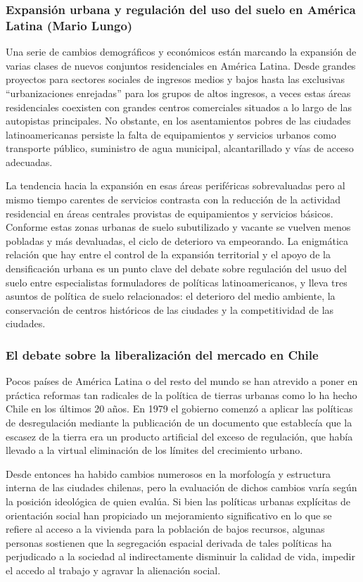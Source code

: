 \subsubsection*{Expansión urbana y regulación del uso del suelo en América Latina (Mario Lungo)}
Una serie de cambios demográficos y económicos están marcando la expansión de varias clases de
nuevos conjuntos residenciales en América Latina. Desde grandes proyectos para sectores sociales de
ingresos medios y bajos hasta las exclusivas ``urbanizaciones enrejadas'' para los grupos de altos
ingresos, a veces estas áreas residenciales coexisten con grandes centros comerciales situados a lo
largo de las autopistas principales. No obstante, en los asentamientos pobres de las ciudades
latinoamericanas persiste la falta de equipamientos y servicios urbanos como transporte público,
suministro de agua municipal, alcantarillado y vías de acceso adecuadas.

La tendencia hacia la expansión en esas áreas periféricas sobrevaluadas pero al mismo tiempo
carentes de servicios contrasta con la reducción de la actividad residencial en áreas centrales
provistas de equipamientos y servicios básicos. Conforme estas zonas urbanas de suelo subutilizado y
vacante se vuelven menos pobladas y más devaluadas, el ciclo de deterioro va empeorando. La
enigmática relación que hay entre el control de la expansión territorial y el apoyo de la
densificación urbana es un punto clave del debate sobre regulación del usuo del suelo entre
especialistas formuladores de políticas latinoamericanos, y lleva tres asuntos de política de suelo
relacionados: el deterioro del medio ambiente, la conservación de centros históricos de las ciudades
y la competitividad de las ciudades.

\subsubsection*{El debate sobre la liberalización del mercado en Chile}

Pocos países de América Latina o del resto del mundo se han atrevido a poner en práctica reformas
tan radicales de la política de tierras urbanas como lo ha hecho Chile en los últimos 20 años. En
1979 el gobierno comenzó a aplicar las políticas de desregulación mediante la publicación de un
documento que establecía que la escasez de la tierra era un producto artificial del exceso de
regulación, que había llevado a la virtual eliminación de los límites del crecimiento urbano.

Desde entonces ha habido cambios numerosos en la morfología y estructura interna de las ciudades
chilenas, pero la evaluación de dichos cambios varía según la posición ideológica de quien evalúa.
Si bien las políticas urbanas explícitas de orientación social han propiciado un mejoramiento
significativo en lo que se refiere al acceso a la vivienda para la población de bajos recursos,
algunas personas sostienen que la segregación espacial derivada de tales políticas ha perjudicado a
la sociedad al indirectamente disminuir la calidad de vida, impedir el accedo al trabajo y agravar
la alienación social.


